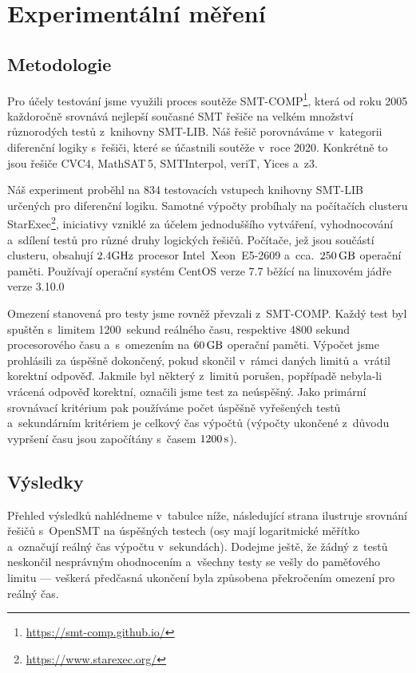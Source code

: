 \chapter{Experimentální měření}

\section{Metodologie}

Pro účely testování jsme využili proces soutěže SMT-COMP\footnote{\url{https://smt-comp.github.io/}}, která od roku 2005 každoročně srovnává nejlepší současné SMT řešiče na velkém množství různorodých testů z~knihovny SMT-LIB. Náš řešič porovnáváme v~kategorii diferenční logiky s~řešiči, které se účastnili soutěže v~roce 2020. Konkrétně to jsou řešiče CVC4, MathSAT\,5, SMTInterpol, veriT, Yices a~z3.

Náš experiment proběhl na 834 testovacích vstupech knihovny SMT-LIB určených pro diferenční logiku. Samotné výpočty probíhaly na počítačích clusteru StarExec\footnote{\url{https://www.starexec.org/}}, iniciativy vzniklé za účelem jednoduššího vytváření, vyhodnocování a~sdílení testů pro různé druhy logických řešičů. Počítače, jež jsou součástí clusteru, obsahují $2.4\rm GHz$ procesor Intel\textregistered\ Xeon\textregistered\ E5-2609 a~cca.~$250\,\rm GB$ operační paměti. Používají operační systém CentOS verze 7.7 běžící na linuxovém jádře verze 3.10.0

Omezení stanovená pro testy jsme rovněž převzali z~SMT-COMP. Každý test byl spuštěn s~limitem 1200~sekund reálného času, respektive 4800 sekund procesorového času a~s~omezením na $60\,\rm GB$ operační paměti. Výpočet jsme prohlásili za úspěšně dokončený, pokud skončil v~rámci daných limitů a~vrátil korektní odpověď. Jakmile byl některý z~limitů porušen, popřípadě nebyla-li vrácená odpověď korektní, označili jsme test za neúspěšný. Jako primární srovnávací kritérium pak používáme počet úspěšně vyřešených testů a~sekundárním kritériem je celkový čas výpočtů (výpočty ukončené z~důvodu vypršení času jsou započítány s~časem $1200\,\rm s$).

\section{Výsledky}

Přehled výsledků nahlédneme v~tabulce níže, následující strana ilustruje srovnání řešičů s~OpenSMT na úspěšných testech (osy mají logaritmické měřítko a~označují reálný čas výpočtu v~sekundách). Dodejme ještě, že žádný z~testů neskončil nesprávným ohodnocením a~všechny testy se vešly do paměťového limitu --- veškerá předčasná ukončení byla způsobena překročením omezení pro reálný čas.

